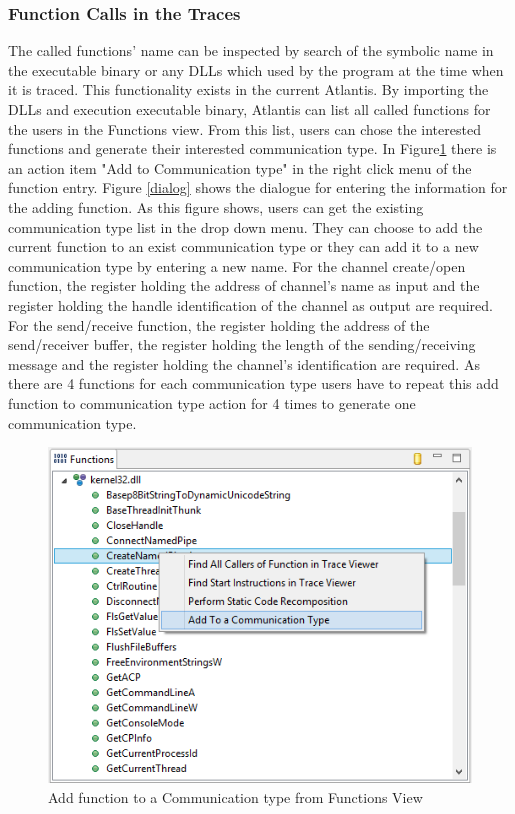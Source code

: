 \documentclass[paper=a4, fontsize=11pt]{scrartcl}
\numberwithin{equation}{section}		%
\numberwithin{figure}{section}			%
\numberwithin{table}{section}				%
\begin{document}
\subsubsection{Function Calls in the Traces}
The called functions' name can be inspected  by  search of the symbolic name in the executable binary or any DLLs which used by the program at the time when it is traced. This functionality exists in the current Atlantis. By importing the DLLs and execution  executable binary, Atlantis can list all called functions for the users in the Functions view. From this list, users can chose the interested functions and generate their interested communication type. In Figure\ref{functionsview} there is  an action item "Add to Communication type" in the right click menu of the function entry. Figure \ref{dialog} shows the dialogue for entering the information for the adding function. As this figure shows, users can get the existing communication type list in the drop down menu. They can choose to add the current function to an exist communication type or they can add it to a new communication type by entering a new name. For the channel create/open function, the register holding the address of channel's name as input and the register holding the handle identification of the channel as output are required. For the send/receive function, the register holding the address of the send/receiver buffer, the register holding the length of the sending/receiving message and the register holding the channel's identification are required. As there are 4 functions for each communication type users have to repeat this add function to communication type action for 4 times to generate one communication type.

\begin{figure}[h]
\includegraphics{functionsview}
 \caption{Add function to a Communication type from Functions View}
\label{functionsview}
\end{figure}
\end{document}
